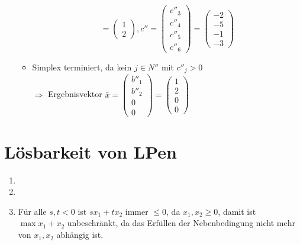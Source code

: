 \documentclass[a4paper,10pt]{article}
\begin{document}
\begin{enumerate}
\begin{itemize}
\[                   = \begin{pmatrix}1 \\ 2\end{pmatrix},
                 c'' = \begin{pmatrix}c''_3 \\ c''_4 \\ c''_5 \\ c''_6\end{pmatrix} 
                   = \begin{pmatrix}-2 \\ -5 \\ -1 \\ -3 \end{pmatrix}
                \]
        \item   Simplex terminiert, da kein $j \in N''$ mit $c''_j > 0$\\
                $\Rightarrow$ Ergebnisvektor $\bar x = \begin{pmatrix}b''_1 \\ b''_2 \\ 0 \\ 0\end{pmatrix} = \begin{pmatrix}1 \\ 2 \\ 0 \\ 0\end{pmatrix}$
        \end{itemize}
\end{enumerate}

\section{Lösbarkeit von LPen}
\begin{enumerate}
\item   
\item   
\item   Für alle $s,t < 0$ ist $sx_1 + tx_2$ immer $\leq 0$, da $x_1, x_2 \geq 0$, damit ist $\max x_1 + x_2$ unbeschränkt, 
        da das Erfüllen der Nebenbedingung nicht mehr von $x_1, x_2$ abhängig ist.
\end{enumerate}
\end{document}
